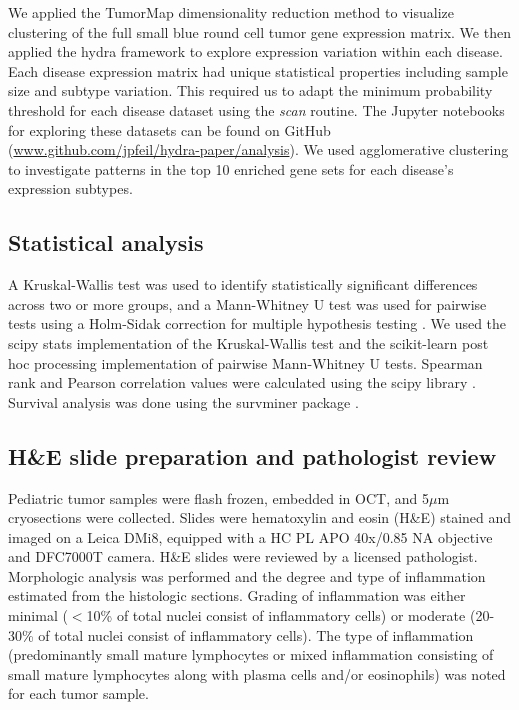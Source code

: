 \documentclass[10pt,letterpaper]{article}
\begin{document}
We applied the TumorMap dimensionality reduction method \cite{newtonTumorMapExploringMolecular2017} to visualize clustering of the full small blue round cell tumor gene expression matrix. We then applied the hydra framework to explore expression variation within each disease. Each disease expression matrix had unique statistical properties including sample size and subtype variation. This required us to adapt the minimum probability threshold for each disease dataset using the \textit{scan} routine. The Jupyter notebooks for exploring these datasets can be found on GitHub (\url{www.github.com/jpfeil/hydra-paper/analysis}). We used agglomerative clustering to investigate patterns in the top 10 enriched gene sets for each disease's expression subtypes.

\subsection*{Statistical analysis}
A Kruskal-Wallis test was used to identify statistically significant differences across two or more groups, and a Mann-Whitney U test was used for pairwise tests using a Holm-Sidak correction for multiple hypothesis testing \cite{pedregosa2011scikit,jonesSciPyOpenSource2001}. We used the scipy \cite{2019arXiv190710121V} stats implementation of the Kruskal-Wallis test and the scikit-learn post hoc processing \cite{Terpilowski2019} implementation of pairwise Mann-Whitney U tests. Spearman rank and Pearson correlation values were calculated using the scipy library \cite{jonesSciPyOpenSource2001}. Survival analysis was done using the survminer package \cite{kassambaraSurvminerDrawingSurvival2019}.

\subsection*{H\&E slide preparation and pathologist review}
Pediatric tumor samples were flash frozen, embedded in OCT, and 5$\mu$m cryosections were collected. Slides were hematoxylin and eosin (H\&E) stained and imaged on a Leica DMi8, equipped with a HC PL APO 40x/0.85 NA objective and DFC7000T camera. H\&E slides were reviewed by a licensed pathologist.  Morphologic analysis was performed and the degree and type of inflammation estimated from the histologic sections. Grading of inflammation was either minimal ($<$10\% of total nuclei consist of inflammatory cells) or  moderate (20-30\% of total nuclei consist of inflammatory cells). The type of inflammation (predominantly small mature lymphocytes or mixed inflammation consisting of small mature lymphocytes along with plasma cells and/or eosinophils) was noted for each tumor sample.
\end{document}
